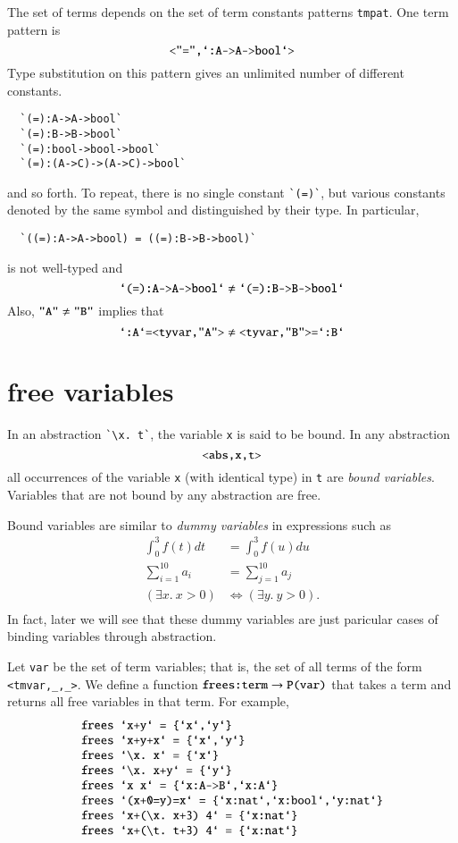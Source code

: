 \documentclass[cup9a]{cupbook}
\begin{document}
The set of terms depends on the set of term constants patterns \verb!tmpat!.  One term pattern is
$$
\verb!<"=",`:A->A->bool`>!
$$
Type substitution on this pattern gives an unlimited number of different constants.
\begin{verbatim}
  `(=):A->A->bool`
  `(=):B->B->bool`
  `(=):bool->bool->bool`
  `(=):(A->C)->(A->C)->bool`
\end{verbatim}
and so forth.  To repeat, there is no single constant \verb!`(=)`!, but various constants denoted by the same symbol and distinguished by their type.
In particular,
\begin{verbatim}
  `((=):A->A->bool) = ((=):B->B->bool)`
\end{verbatim}
is not well-typed and
$$
\verb!`(=):A->A->bool`! \ne \verb!`(=):B->B->bool`!
$$
Also,
$\verb!"A"!\ne \verb!"B"!$ implies that
$$
\verb!`:A`=<tyvar,"A">!\ne\verb!<tyvar,"B">=`:B`!
$$ 
\section{free variables}

In an abstraction \verb!`\x. t`!, the variable \verb!x! is said to be
bound.  In any abstraction
$$
\verb!<abs,x,t>!
$$
all occurrences of the variable \verb!x! (with identical type) in \verb!t! are {\it bound variables}.  Variables that are not bound by any abstraction are free.

Bound variables are similar to {\it dummy variables} in expressions such as 
$$
\begin{array}{lll}
\int_0^3 f(t) dt &= \int_0^3 f(u) du\\
\sum_{i=1}^{10} a_i &= \sum_{j=1}^{10} a_j\\
(\exists x.~x>0)  &\Leftrightarrow (\exists y.~y>0).\\
\end{array}
$$
In fact, later we will see that these dummy variables are just paricular cases of binding variables through abstraction.

Let \verb!var! be the set of term variables; that is, the
set of all terms of the form \verb!<tmvar,_,_>!.
We define a function $\verb!frees:term!\to \verb!P(var)!$
that takes a term and returns all free variables in that term.  For example,
$$
\begin{array}{lll}
\verb!frees `x+y` = {`x`,`y`}!\\
\verb!frees `x+y+x` = {`x`,`y`}!\\
\verb!frees `\x. x` = {`x`}!\\
\verb!frees `\x. x+y` = {`y`}!\\
\verb!frees `x x` = {`x:A->B`,`x:A`}!\\
\verb!frees `(x+0=y)=x` = {`x:nat`,`x:bool`,`y:nat`}!\\
\verb!frees `x+(\x. x+3) 4` = {`x:nat`}!\\
\verb!frees `x+(\t. t+3) 4` = {`x:nat`}!\\
\end{array}
$$
\end{document}
